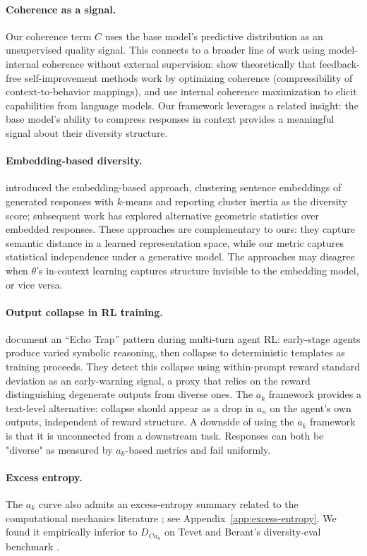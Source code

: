 \paragraph{Coherence as a signal.} Our coherence term $C$ uses the base model's predictive distribution as an unsupervised quality signal.
This connects to a broader line of work using model-internal coherence without external supervision: \citet{qiu2026selfimprovement} show theoretically that feedback-free self-improvement methods work by optimizing coherence (compressibility of context-to-behavior mappings), and \citet{wen2025unsupervised} use internal coherence maximization to elicit capabilities from language models.
Our framework leverages a related insight: the base model's ability to compress responses in context provides a meaningful signal about their diversity structure.

\paragraph{Embedding-based diversity.} \citet{du2019boosting} introduced the embedding-based approach, clustering sentence embeddings of generated responses with $k$-means and reporting cluster inertia as the diversity score; subsequent work has explored alternative geometric statistics over embedded responses.
These approaches are complementary to ours: they capture semantic distance in a learned representation space, while our metric captures statistical independence under a generative model.
The approaches may disagree when $\theta$'s in-context learning captures structure invisible to the embedding model, or vice versa.

\paragraph{Output collapse in RL training.} \citet{wang2025ragen} document an ``Echo Trap'' pattern during multi-turn agent RL: early-stage agents produce varied symbolic reasoning, then collapse to deterministic templates as training proceeds.
They detect this collapse using within-prompt reward standard deviation as an early-warning signal, a proxy that relies on the reward distinguishing degenerate outputs from diverse ones.
The $a_k$ framework provides a text-level alternative: collapse should appear as a drop in $a_n$ on the agent's own outputs, independent of reward structure. A downside of using the $a_k$ framework is that it is unconnected from a downstream task. Responses can both be "diverse" as measured by $a_k$-based metrics and fail uniformly.

\paragraph{Excess entropy.} The $a_k$ curve also admits an excess-entropy summary related to the computational mechanics literature \citep{crutchfield2003regularities}; see Appendix~\ref{app:excess-entropy}.
We found it empirically inferior to $D_{Ca_n}$ on Tevet and Berant's diversity-eval benchmark \citep{tevet2020evaluating}.